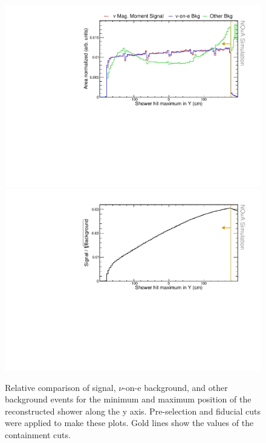 \begin{figure}[hbtp]
\centering
\includegraphics[width=.9\textwidth]{Plots/NuMMEventSelection/N1Cut_maxY.pdf}
\includegraphics[width=.9\textwidth]{Plots/NuMMEventSelection/NuMM_N1Cut_maxYleft_FOMStats}
\caption{Relative comparison of signal, $\nu$-on-e background, and other background events for the minimum and maximum position of the reconstructed shower along the y axis. Pre-selection and fiducial cuts were applied to make these plots. Gold lines show the values of the containment cuts.}
\label{fig:NuMMContainmentCutMaxY}
\end{figure}

